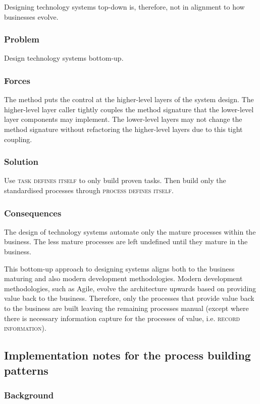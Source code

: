 \documentclass[prodmode]{style/acmlarge}
\begin{document}
Designing technology systems top-down is, therefore, not in alignment to how
businesses evolve.

\subsubsection*{Problem} Design technology systems bottom-up.

\subsubsection*{Forces} The method puts the control at the higher-level layers
of the system design.  The higher-level layer caller tightly couples the method
signature that the lower-level layer components may implement.  The lower-level
layers may not change the method signature without refactoring the higher-level
layers due to this tight coupling.

\subsubsection*{Solution} Use \textsc{task defines itself} to only build proven
tasks.  Then build only the standardised processes through \textsc{process
defines itself}.

\subsubsection*{Consequences} The design of technology systems automate only the
mature processes within the business.  The less mature processes are left
undefined until they mature in the business.

This bottom-up approach to designing systems aligns both to the business
maturing and also modern development methodologies.  Modern development
methodologies, such as Agile, evolve the architecture upwards based on providing
value back to the business.  Therefore, only the processes that provide value
back to the business are built leaving the remaining processes manual (except
where there is necessary information capture for the processes of value, i.e.
\textsc{record information}).



\subsection{Implementation notes for the process building patterns}

\subsubsection*{Background}
\end{document}
